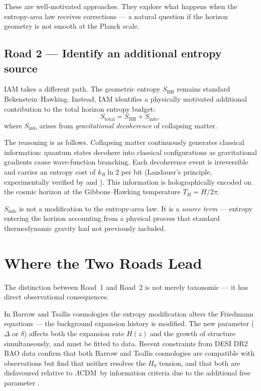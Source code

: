 \documentclass[12pt]{article}
\newcommand{\Sbh}{S_\mathrm{BH}}
\newcommand{\Sinfo}{S_\mathrm{info}}
\newcommand{\Stot}{S_\mathrm{total}}
\newcommand{\THawk}{T_H}
\newcommand{\LCDM}{$\Lambda$CDM}
\begin{document}
These are well-motivated approaches.  They explore what happens when the
entropy-area law receives corrections --- a natural question if the horizon geometry
is not smooth at the Planck scale.

\subsection{Road 2 --- Identify an additional entropy source}

IAM takes a different path.  The geometric entropy $\Sbh$ remains standard
Bekenstein--Hawking.  Instead, IAM identifies a physically motivated additional
contribution to the total horizon entropy budget:
\begin{equation}
  \Stot = \Sbh + \Sinfo,
  \label{eq:stotal}
\end{equation}
where $\Sinfo$ arises from \emph{gravitational decoherence} of collapsing matter.

The reasoning is as follows.  Collapsing matter continuously generates classical
information: quantum states decohere into classical configurations as gravitational
gradients cause wave-function branching.  Each decoherence event is irreversible
and carries an entropy cost of $k_B \ln 2$ per bit (Landauer's principle,
experimentally verified by \citealt{Berut2012} and \citealt{Jun2014}).  This
information is holographically encoded on the cosmic horizon at the
Gibbons--Hawking temperature $\THawk = H/2\pi$.

$\Sinfo$ is not a modification to the entropy-area law.  It is a \emph{source
term} --- entropy entering the horizon accounting from a physical process that
standard thermodynamic gravity had not previously included.

\section{Where the Two Roads Lead}

The distinction between Road~1 and Road~2 is not merely taxonomic --- it has
direct observational consequences.

In Barrow and Tsallis cosmologies the entropy modification alters the Friedmann
equations --- the background expansion history is modified.  The new parameter
($\Delta$ or $\delta$) affects both the expansion rate $H(z)$ and the growth of
structure simultaneously, and must be fitted to data.  Recent constraints from
DESI DR2 BAO data confirm that both Barrow and Tsallis cosmologies are compatible
with observations but find that neither resolves the $H_0$ tension, and that both
are disfavoured relative to \LCDM\ by information criteria due to the additional
free parameter \citep{Luciano2025}.
\end{document}

